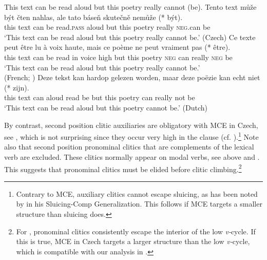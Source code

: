 \documentclass[output=paper,colorlinks,citecolor=brown,
modfonts
]{langscibook}
\begin{document}
\begin{exe}
\ex \label{27}
\begin{xlist}
\ex \label{27a} This text can be read aloud but this poetry really cannot (be).
\ex \label{27b} 
\gll Tento text může být čten nahlas, ale tato báseň  skutečně nemůže (*\hspace{-2pt} být).\\
this text can be read.\textsc{pass} aloud but this poetry really \textsc{neg}.can {} be\\
\glt `This text can be read aloud but this poetry really cannot be.' \hfill (Czech)
\ex \label{27c}
\gll Ce texte peut être lu à voix haute, mais ce poème ne peut vraiment pas (*\hspace{-2pt} être).\\
this text can be read in voice high but this poetry \textsc{neg} can really \textsc{neg} {} be\\
\glt `This text can be read aloud but this poetry really cannot be.' \\ \hfill (French; \citealt{Dagnac2010})
\ex \label{27d} 
\gll Deze tekst kan hardop gelezen worden, maar deze poëzie kan echt niet (*\hspace{-2pt} zijn).\\
this text can aloud read be but this  poetry can  really not {} be\\
\glt `This text can be read aloud but this poetry cannot be.' \hfill (Dutch)
\end{xlist}
\end{exe}	

\noindent By contrast, second position clitic auxiliaries are obligatory with MCE in Czech, see , which is not surprising since they occur very high in the clause (cf. ).\footnote{Contrary to MCE, auxiliary clitics cannot escape sluicing, as has been noted by \cite{Merchant2001} in his Sluicing-Comp Generalization. This follows if MCE targets a smaller structure than sluicing does.} Note also that second position pronominal clitics that are complements of the lexical verb are excluded. These clitics normally appear on modal verbs, see  above and . This suggests that pronominal clitics must be elided before clitic climbing.\footnote{For \cite{Roberts2010}, pronominal clitics consistently escape the interior of the low \textit{v-}cycle. If this is true, MCE in Czech targets a larger structure than the low \textit{v-}cycle, which is compatible with our analysis in  .}
\end{document}
